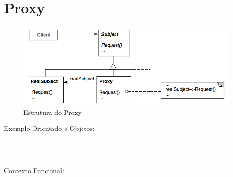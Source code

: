 \section{Proxy}

\begin{figure}[htb]
	\caption{\label{fig_grafico}Estrutura do Proxy}
	\begin{center}
	    \includegraphics[scale=0.5]{5_padroes-contexto-funcional/5.2_estruturais/5.2.7_proxy/diagram.png}
	\end{center}
\end{figure}

Exemplo Orientado a Objetos:

\begin{lstlisting}[caption={Proxy Orientado a Objetos},label=ooproxy]



\end{lstlisting}

Contexto Funcional:


\begin{lstlisting}[caption={Proxy Funcional},label=fpproxy]
    

    
\end{lstlisting}